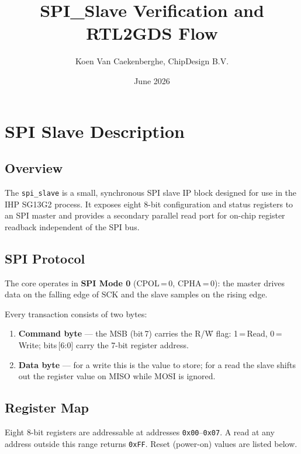 \documentclass[11pt]{article}
\title{SPI\_Slave Verification and RTL2GDS Flow}
\author{Koen Van Caekenberghe, ChipDesign B.V.}
\date{June 2026}
\begin{document}
\maketitle
\tableofcontents
\newpage

\section{SPI Slave Description}

\subsection{Overview}
The \texttt{spi\_slave} is a small, synchronous SPI slave IP block designed for use in the IHP SG13G2 process. It exposes eight 8-bit configuration and status registers to an SPI master and provides a secondary parallel read port for on-chip register readback independent of the SPI bus.

\subsection{SPI Protocol}
The core operates in \textbf{SPI Mode 0} (CPOL\,=\,0, CPHA\,=\,0): the master drives data on the falling edge of SCK and the slave samples on the rising edge.

Every transaction consists of two bytes:
\begin{enumerate}
  \item \textbf{Command byte} — the MSB (bit\,7) carries the R/\=W flag: 1\,=\,Read, 0\,=\,Write; bits\,[6:0] carry the 7-bit register address.
  \item \textbf{Data byte} — for a write this is the value to store; for a read the slave shifts out the register value on MISO while MOSI is ignored.
\end{enumerate}

\subsection{Register Map}
Eight 8-bit registers are addressable at addresses \texttt{0x00}--\texttt{0x07}. A read at any address outside this range returns \texttt{0xFF}. Reset (power-on) values are listed below.
\end{document}
